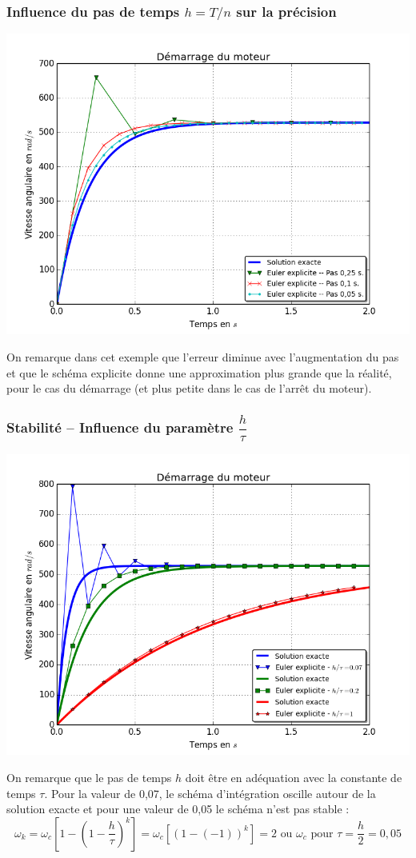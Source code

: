 \documentclass[10pt,fleqn]{article} %
\begin{document}
\subsubsection{Influence du pas de temps $h=T/n$ sur la précision}

\begin{center}
\includegraphics[width=.7\textwidth]{images/fig_07_bis}
\end{center}

On remarque dans cet exemple que l’erreur diminue avec l’augmentation du pas et que le schéma explicite donne une approximation plus grande que la réalité, pour le cas du démarrage (et plus petite dans le cas de l’arrêt du moteur).


\subsubsection{Stabilité -- Influence du paramètre $\dfrac{h}{\tau}$}

\begin{center}
\includegraphics[width=.7\textwidth]{images/fig_08_bis}
\end{center}

On remarque que le pas de temps $h$ doit être en adéquation avec la constante de temps $\tau$. Pour la valeur de 0,07, le schéma d’intégration oscille autour de la solution exacte et pour une valeur de 0,05 le schéma n’est pas stable :
$$\omega_k=\omega_c\left[1-\left(1-\dfrac{h}{\tau}\right)^k \right]=\omega_c[(1-(-1))^k ]=2\text{ ou }\omega_c \text{ pour } \tau=\dfrac{h}{2}=0,05 $$
\end{document}
